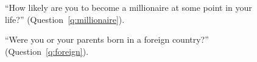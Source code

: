 \begin{figure}[h!]
    \caption[Likelihood of becoming a millionaire]{``How likely are you to become a millionaire at some point in your life?'' (Question~\ref{q:millionaire}).
    }\label{fig:millionaire}
\end{figure}

\begin{figure}[h!]
    \caption[Foreign origin]{``Were you or your parents born in a foreign country?'' (Question~\ref{q:foreign}).
    }\label{fig:foreign}
\end{figure}

